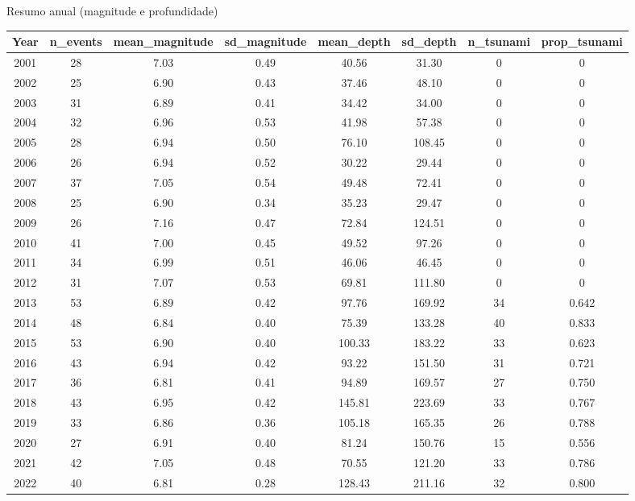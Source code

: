 \documentclass[aspectratio= 169, xcolor=dvipsnames]{beamer}
\begin{document}
\begin{frame}{Resumo anual (magnitude e profundidade)}
    \tiny
    \begin{table}[ht]
\centering
\begin{tabular}{cccccccc}
\hline
Year & n\_events & mean\_magnitude & sd\_magnitude & mean\_depth & sd\_depth & n\_tsunami & prop\_tsunami \\
\hline
2001 & 28 & 7.03 & 0.49 & 40.56 & 31.30 & 0 & 0 \\
2002 & 25 & 6.90 & 0.43 & 37.46 & 48.10 & 0 & 0 \\
2003 & 31 & 6.89 & 0.41 & 34.42 & 34.00 & 0 & 0 \\
2004 & 32 & 6.96 & 0.53 & 41.98 & 57.38 & 0 & 0 \\
2005 & 28 & 6.94 & 0.50 & 76.10 & 108.45 & 0 & 0 \\
2006 & 26 & 6.94 & 0.52 & 30.22 & 29.44 & 0 & 0 \\
2007 & 37 & 7.05 & 0.54 & 49.48 & 72.41 & 0 & 0 \\
2008 & 25 & 6.90 & 0.34 & 35.23 & 29.47 & 0 & 0 \\
2009 & 26 & 7.16 & 0.47 & 72.84 & 124.51 & 0 & 0 \\
2010 & 41 & 7.00 & 0.45 & 49.52 & 97.26 & 0 & 0 \\
2011 & 34 & 6.99 & 0.51 & 46.06 & 46.45 & 0 & 0 \\
2012 & 31 & 7.07 & 0.53 & 69.81 & 111.80 & 0 & 0 \\
2013 & 53 & 6.89 & 0.42 & 97.76 & 169.92 & 34 & 0.642 \\
2014 & 48 & 6.84 & 0.40 & 75.39 & 133.28 & 40 & 0.833 \\
2015 & 53 & 6.90 & 0.40 & 100.33 & 183.22 & 33 & 0.623 \\
2016 & 43 & 6.94 & 0.42 & 93.22 & 151.50 & 31 & 0.721 \\
2017 & 36 & 6.81 & 0.41 & 94.89 & 169.57 & 27 & 0.750 \\
2018 & 43 & 6.95 & 0.42 & 145.81 & 223.69 & 33 & 0.767 \\
2019 & 33 & 6.86 & 0.36 & 105.18 & 165.35 & 26 & 0.788 \\
2020 & 27 & 6.91 & 0.40 & 81.24 & 150.76 & 15 & 0.556 \\
2021 & 42 & 7.05 & 0.48 & 70.55 & 121.20 & 33 & 0.786 \\
2022 & 40 & 6.81 & 0.28 & 128.43 & 211.16 & 32 & 0.800 \\
\hline
\end{tabular}
\end{table}

\end{frame}
\end{document}
